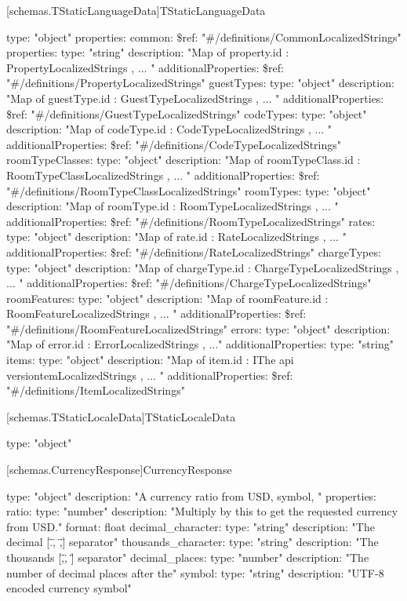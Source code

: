 [schemas.TStaticLanguageData]{TStaticLanguageData}
\begin{codeblock}
  type: "object"
  properties:
    common:
      \$ref: "#/definitions/CommonLocalizedStrings"
     properties:
       type: "string"
       description: "Map of { property.id : { PropertyLocalizedStrings }, ... }"
       additionalProperties:
         \$ref: "#/definitions/PropertyLocalizedStrings"
    guestTypes:
      type: "object"
      description: "Map of { guestType.id : { GuestTypeLocalizedStrings }, ... }"
      additionalProperties:
        \$ref: "#/definitions/GuestTypeLocalizedStrings"
    codeTypes:
      type: "object"
      description: "Map of { codeType.id : { CodeTypeLocalizedStrings }, ... }"
      additionalProperties:
        \$ref: "#/definitions/CodeTypeLocalizedStrings"
    roomTypeClasses:
      type: "object"
      description: "Map of { roomTypeClass.id : { RoomTypeClassLocalizedStrings }, ... }"
      additionalProperties:
        \$ref: "#/definitions/RoomTypeClassLocalizedStrings"
    roomTypes:
      type: "object"
      description: "Map of { roomType.id : { RoomTypeLocalizedStrings }, ... }"
      additionalProperties:
        \$ref: "#/definitions/RoomTypeLocalizedStrings"
    rates:
      type: "object"
      description: "Map of { rate.id : { RateLocalizedStrings }, ... }"
      additionalProperties:
        \$ref: "#/definitions/RateLocalizedStrings"
    chargeTypes:
      type: "object"
      description: "Map of { chargeType.id : { ChargeTypeLocalizedStrings }, ... }"
      additionalProperties:
        \$ref: "#/definitions/ChargeTypeLocalizedStrings"
    roomFeatures:
      type: "object"
      description: "Map of { roomFeature.id : { RoomFeatureLocalizedStrings }, ... }"
      additionalProperties:
        \$ref: "#/definitions/RoomFeatureLocalizedStrings"
    errors:
      type: "object"
      description: "Map of { error.id : { ErrorLocalizedStrings }, ...}"
      additionalProperties:
        type: "string"
    items:
      type: "object"
      description: "Map of { item.id : { IThe api versiontemLocalizedStrings }, ... }"
      additionalProperties:
        \$ref: "#/definitions/ItemLocalizedStrings"
\end{codeblock}

[schemas.TStaticLocaleData]{TStaticLocaleData}
\begin{codeblock}
  type: "object"
\end{codeblock}

[schemas.CurrencyResponse]{CurrencyResponse}
\begin{codeblock}
  type: "object"
  description: "A currency ratio from USD, symbol, "
  properties:
     ratio:
       type: "number"
       description: "Multiply by this to get the requested currency from USD."
       format: float
     decimal_character:
       type: "string"
       description: "The decimal [\".\", \",\"] separator"
     thousands_character:
       type: "string"
       description: "The thousands [\",\", \" \"] separator"
     decimal_places:
       type: "number"
       description: "The number of decimal places after the"
     symbol:
       type: "string"
       description: "UTF-8 encoded currency symbol"
\end{codeblock}

